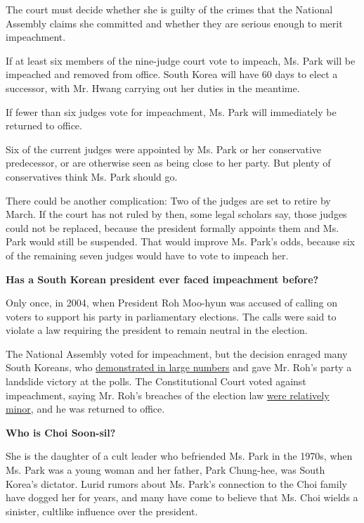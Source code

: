 The court must decide whether she is guilty of the crimes that the
National Assembly claims she committed and whether they are serious
enough to merit impeachment.

If at least six members of the nine-judge court vote to impeach, Ms.
Park will be impeached and removed from office. South Korea will have 60
days to elect a successor, with Mr. Hwang carrying out her duties in the
meantime.

If fewer than six judges vote for impeachment, Ms. Park will immediately
be returned to office.

Six of the current judges were appointed by Ms. Park or her conservative
predecessor, or are otherwise seen as being close to her party. But
plenty of conservatives think Ms. Park should go.

There could be another complication: Two of the judges are set to retire
by March. If the court has not ruled by then, some legal scholars say,
those judges could not be replaced, because the president formally
appoints them and Ms. Park would still be suspended. That would improve
Ms. Park's odds, because six of the remaining seven judges would have to
vote to impeach her.

\textbf{Has a South Korean president ever faced impeachment before?}

Only once, in 2004, when President Roh Moo-hyun was accused of calling
on voters to support his party in parliamentary elections. The calls
were said to violate a law requiring the president to remain neutral in
the election.

The National Assembly voted for impeachment, but the decision enraged
many South Koreans, who
\href{http://www.nytimes3xbfgragh.onion/2004/03/13/world/president-s-impeachment-stirs-angry-protests-in-south-korea.html}{demonstrated
in large numbers} and gave Mr. Roh's party a landslide victory at the
polls. The Constitutional Court voted against impeachment, saying Mr.
Roh's breaches of the election law
\href{http://www.nytimes3xbfgragh.onion/2004/05/14/world/constitutional-court-reinstates-south-korea-s-impeached-president.html}{were
relatively minor}, and he was returned to office.

\textbf{Who is Choi Soon-sil?}

She is the daughter of a cult leader who befriended Ms. Park in the
1970s, when Ms. Park was a young woman and her father, Park Chung-hee,
was South Korea's dictator. Lurid rumors about Ms. Park's connection to
the Choi family have dogged her for years, and many have come to believe
that Ms. Choi wields a sinister, cultlike influence over the president.

